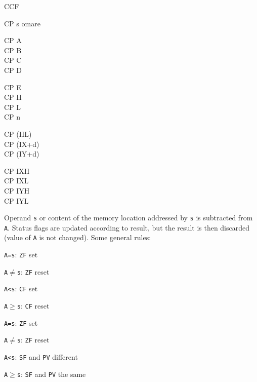 \begin{basedescript}{
    \desclabelstyle{\multilinelabel}
    \desclabelwidth{3cm}}
\begin{DetailItem}{CCF}
    \end{DetailItem}
	
    \pagebreak
    \label{DetailRefCP}
    \begin{DetailItem}{CP s}
        {omare}
        {}

        \begin{DetailVariants}[4]
            CP A\\
            CP B\\
            CP C\\
            CP D

            \columnbreak
            CP E\\
            CP H\\
            CP L\\
            CP n

            \columnbreak
            CP (HL)\\
            CP (IX+d)\\
            CP (IY+d)

            \columnbreak
            CP IXH\UNDOC\\
            CP IXL\UNDOC\\
            CP IYH\UNDOC\\
            CP IYL\UNDOC
        \end{DetailVariants}

        Operand {\tt s} or content of the memory location addressed by {\tt s} is subtracted from {\tt A}. Status flags are updated according to result, but the result is then discarded (value of {\tt A} is not changed). Some general rules:

        \begin{multicols}{2}
            \begin{DetailCompactList}[Signed]
                \item {\tt A=s}: {\tt ZF} set
                \item {\tt A$\neq$s}: {\tt ZF} reset
                \item {\tt A<s}: {\tt CF} set
                \item {\tt A$\geqslant$s}: {\tt CF} reset	
            \end{DetailCompactList}

            \columnbreak
            \begin{DetailCompactList}[Unsigned]
                \item {\tt A=s}: {\tt ZF} set
                \item {\tt A$\neq$s}: {\tt ZF} reset
                \item {\tt A<s}: {\tt SF} and {\tt PV} different
                \item {\tt A$\geqslant$s}: {\tt SF} and {\tt PV} the same				
            \end{DetailCompactList}
        \end{multicols}


\end{DetailItem}
\end{basedescript}
